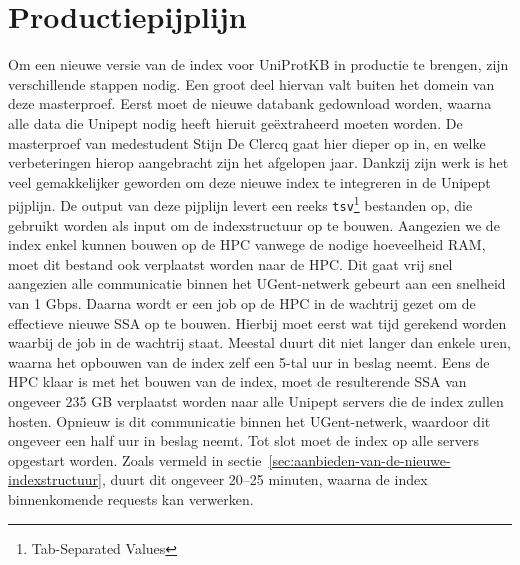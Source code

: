 \section{Productiepijplijn}
Om een nieuwe versie van de index voor UniProtKB in productie te brengen, zijn verschillende stappen nodig.
Een groot deel hiervan valt buiten het domein van deze masterproef.
Eerst moet de nieuwe databank gedownload worden, waarna alle data die Unipept nodig heeft hieruit geëxtraheerd moeten worden.
De masterproef van medestudent Stijn De Clercq gaat hier dieper op in, en welke verbeteringen hierop aangebracht zijn het afgelopen jaar.
Dankzij zijn werk is het veel gemakkelijker geworden om deze nieuwe index te integreren in de Unipept pijplijn.
De output van deze pijplijn levert een reeks \texttt{tsv}\footnote{Tab-Separated Values} bestanden op, die gebruikt worden als input om de indexstructuur op te bouwen.
Aangezien we de index enkel kunnen bouwen op de HPC vanwege de nodige hoeveelheid RAM, moet dit bestand ook verplaatst worden naar de HPC\@.
Dit gaat vrij snel aangezien alle communicatie binnen het UGent-netwerk gebeurt aan een snelheid van 1 Gbps.
Daarna wordt er een job op de HPC in de wachtrij gezet om de effectieve nieuwe SSA op te bouwen.
Hierbij moet eerst wat tijd gerekend worden waarbij de job in de wachtrij staat.
Meestal duurt dit niet langer dan enkele uren, waarna het opbouwen van de index zelf een 5-tal uur in beslag neemt.
Eens de HPC klaar is met het bouwen van de index, moet de resulterende SSA van ongeveer 235 GB verplaatst worden naar alle Unipept servers die de index zullen hosten.
Opnieuw is dit communicatie binnen het UGent-netwerk, waardoor dit ongeveer een half uur in beslag neemt.
Tot slot moet de index op alle servers opgestart worden.
Zoals vermeld in sectie~\ref{sec:aanbieden-van-de-nieuwe-indexstructuur}, duurt dit ongeveer 20--25 minuten, waarna de index binnenkomende requests kan verwerken.
